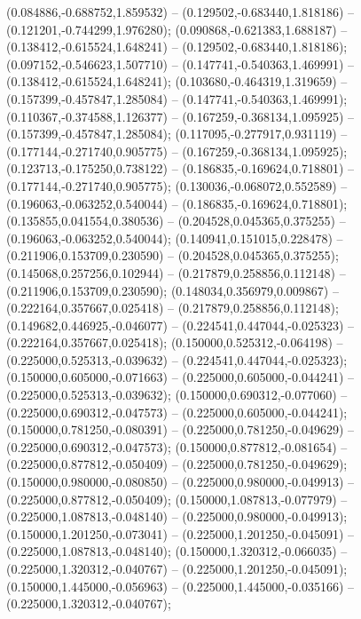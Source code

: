  (0.084886,-0.688752,1.859532) -- (0.129502,-0.683440,1.818186) -- (0.121201,-0.744299,1.976280);
 (0.090868,-0.621383,1.688187) -- (0.138412,-0.615524,1.648241) -- (0.129502,-0.683440,1.818186);
 (0.097152,-0.546623,1.507710) -- (0.147741,-0.540363,1.469991) -- (0.138412,-0.615524,1.648241);
 (0.103680,-0.464319,1.319659) -- (0.157399,-0.457847,1.285084) -- (0.147741,-0.540363,1.469991);
 (0.110367,-0.374588,1.126377) -- (0.167259,-0.368134,1.095925) -- (0.157399,-0.457847,1.285084);
 (0.117095,-0.277917,0.931119) -- (0.177144,-0.271740,0.905775) -- (0.167259,-0.368134,1.095925);
 (0.123713,-0.175250,0.738122) -- (0.186835,-0.169624,0.718801) -- (0.177144,-0.271740,0.905775);
 (0.130036,-0.068072,0.552589) -- (0.196063,-0.063252,0.540044) -- (0.186835,-0.169624,0.718801);
 (0.135855,0.041554,0.380536) -- (0.204528,0.045365,0.375255) -- (0.196063,-0.063252,0.540044);
 (0.140941,0.151015,0.228478) -- (0.211906,0.153709,0.230590) -- (0.204528,0.045365,0.375255);
 (0.145068,0.257256,0.102944) -- (0.217879,0.258856,0.112148) -- (0.211906,0.153709,0.230590);
 (0.148034,0.356979,0.009867) -- (0.222164,0.357667,0.025418) -- (0.217879,0.258856,0.112148);
 (0.149682,0.446925,-0.046077) -- (0.224541,0.447044,-0.025323) -- (0.222164,0.357667,0.025418);
 (0.150000,0.525312,-0.064198) -- (0.225000,0.525313,-0.039632) -- (0.224541,0.447044,-0.025323);
 (0.150000,0.605000,-0.071663) -- (0.225000,0.605000,-0.044241) -- (0.225000,0.525313,-0.039632);
 (0.150000,0.690312,-0.077060) -- (0.225000,0.690312,-0.047573) -- (0.225000,0.605000,-0.044241);
 (0.150000,0.781250,-0.080391) -- (0.225000,0.781250,-0.049629) -- (0.225000,0.690312,-0.047573);
 (0.150000,0.877812,-0.081654) -- (0.225000,0.877812,-0.050409) -- (0.225000,0.781250,-0.049629);
 (0.150000,0.980000,-0.080850) -- (0.225000,0.980000,-0.049913) -- (0.225000,0.877812,-0.050409);
 (0.150000,1.087813,-0.077979) -- (0.225000,1.087813,-0.048140) -- (0.225000,0.980000,-0.049913);
 (0.150000,1.201250,-0.073041) -- (0.225000,1.201250,-0.045091) -- (0.225000,1.087813,-0.048140);
 (0.150000,1.320312,-0.066035) -- (0.225000,1.320312,-0.040767) -- (0.225000,1.201250,-0.045091);
 (0.150000,1.445000,-0.056963) -- (0.225000,1.445000,-0.035166) -- (0.225000,1.320312,-0.040767);
